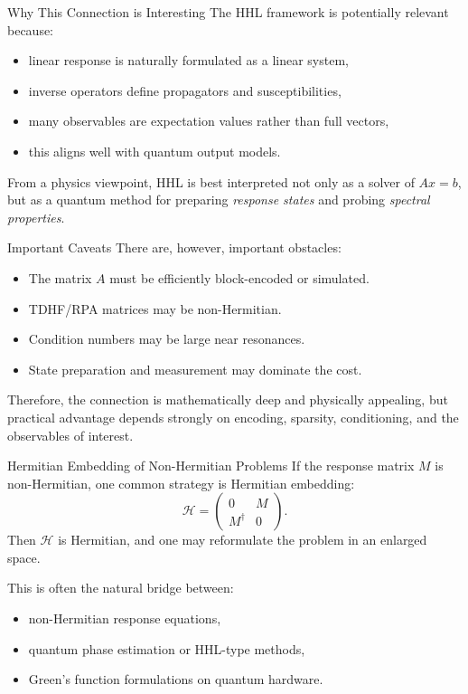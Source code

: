 \documentclass{beamer}
\begin{document}

\begin{frame}{Why This Connection is Interesting}
  The HHL framework is potentially relevant because:
  \begin{itemize}
  \item linear response is naturally formulated as a linear system,
  \item inverse operators define propagators and susceptibilities,
  \item many observables are expectation values rather than full vectors,
  \item this aligns well with quantum output models.
  \end{itemize}

  From a physics viewpoint, HHL is best interpreted not only as a solver of \(Ax=b\), but as a quantum method for preparing \emph{response states} and probing \emph{spectral properties}.
\end{frame}


\begin{frame}{Important Caveats}
  There are, however, important obstacles:
  \begin{itemize}
  \item The matrix \(A\) must be efficiently block-encoded or simulated.
  \item TDHF/RPA matrices may be non-Hermitian.
  \item Condition numbers may be large near resonances.
  \item State preparation and measurement may dominate the cost.
  \end{itemize}

  Therefore, the connection is mathematically deep and physically appealing, but practical advantage depends strongly on encoding, sparsity, conditioning, and the observables of interest.
\end{frame}


\begin{frame}{Hermitian Embedding of Non-Hermitian Problems}
  If the response matrix \(M\) is non-Hermitian, one common strategy is Hermitian embedding:
  \[
  \mathcal{H}
  =
  \begin{pmatrix}
    0 & M \\
    M^\dagger & 0
  \end{pmatrix}.
  \]
  Then \(\mathcal{H}\) is Hermitian, and one may reformulate the problem in an enlarged space.

  This is often the natural bridge between:
  \begin{itemize}
  \item non-Hermitian response equations,
  \item quantum phase estimation or HHL-type methods,
  \item Green's function formulations on quantum hardware.
  \end{itemize}
\end{frame}
\end{document}
